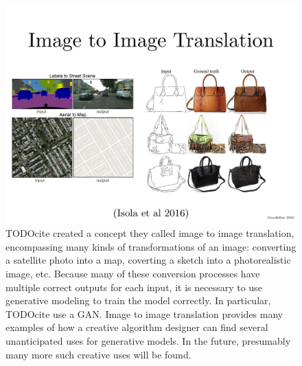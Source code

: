 \begin{figure}
  \centering
  \includegraphics[width=\textwidth]{im2im}
  \caption{
    TODOcite 
    created a concept they called {image to image translation},
    encompassing many kinds of transformations of an image:
    converting a satellite photo into a map,
    coverting a sketch into a photorealistic image,
    etc.
    Because many of these conversion processes have multiple
    correct outputs for each input, it is necessary to use
    generative modeling to train the model correctly.
    In particular, TODOcite use a GAN.
    Image to image translation provides many examples of how
    a creative algorithm designer can find several unanticipated uses
    for generative models.
    In the future, presumably many more such creative uses
    will be found.
  }
  \label{fig:im2im}
\end{figure}
